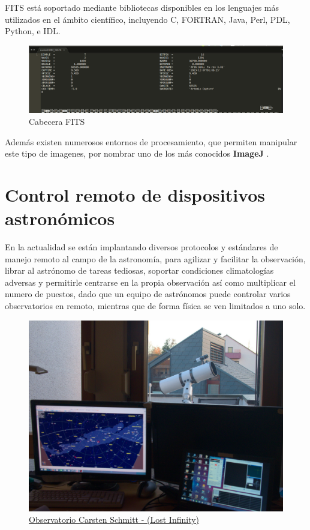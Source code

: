 \bigskip
FITS está soportado mediante bibliotecas disponibles en los lenguajes más utilizados en el ámbito científico, incluyendo C, FORTRAN, Java, Perl, PDL, Python, e IDL. 

\begin{figure}[h]
	\centering
	\includegraphics[width=1.0\linewidth]{../images/fit}
	\caption[Cabecera FITS]{Cabecera FITS}
	\label{fig:fit}
	\end{figure}
	
	\bigskip
	Además existen numerosos entornos de procesamiento, que permiten manipular este tipo de imagenes, por nombrar uno de los más conocidos \textbf{ImageJ} \cite{Imagej}.
	


\newpage
\section{Control remoto de dispositivos astronómicos}

En la actualidad se están implantando diversos protocolos y estándares de manejo remoto al campo de la astronomía, para agilizar y facilitar la observación, librar al astrónomo de tareas tediosas, soportar condiciones climatologías adversas y permitirle centrarse en la propia observación así como multiplicar el numero de puestos, dado que un equipo de astrónomos puede controlar varios observatorios en remoto, mientras que de forma física se ven limitados a uno solo. 

\begin{figure}[h]
\centering
\includegraphics[width=0.7\linewidth]{../images/robotizacion}
\caption{\href{http://www.lost-infinity.com/equipment/}{Observatorio Carsten Schmitt - (Lost Infinity)}}
\label{fig:robotizacion}
\end{figure}

